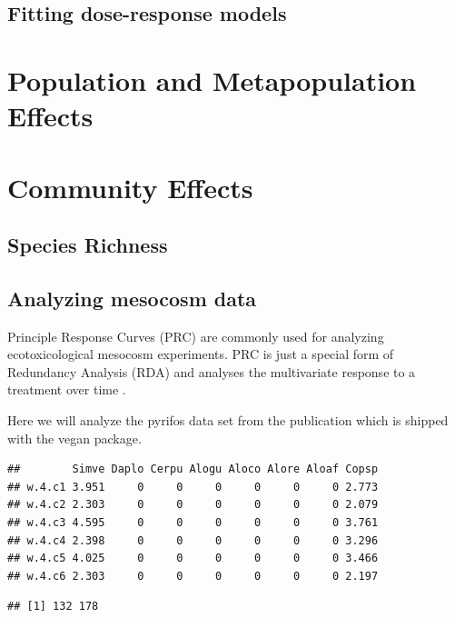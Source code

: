 \documentclass{tufte-book}\usepackage{knitr}
\begin{document}
\section{Fitting dose-response models}



\chapter{Population and Metapopulation Effects}



\chapter{Community Effects}

\section{Species Richness}

\section{Analyzing mesocosm data}
Principle Response Curves (PRC)\cite{van_den_brink_principal_1999} are commonly
used for analyzing ecotoxicological mesocosm experiments. PRC is just a 
special form of Redundancy Analysis (RDA) and analyses the multivariate response
to a treatment over time \cite{legendre_numerical_2013}.

Here we will analyze the pyrifos data set from the publication\cite{van_den_brink_principal_1999} which is shipped with the vegan package.

\begin{knitrout}
\color{fgcolor}\begin{kframe}
\begin{alltt}
\hlstd{(pyrifos[,} \hlstd{(}\hlopt{:}\hlstd{)])}
\end{alltt}
\begin{verbatim}
##        Simve Daplo Cerpu Alogu Aloco Alore Aloaf Copsp
## w.4.c1 3.951     0     0     0     0     0     0 2.773
## w.4.c2 2.303     0     0     0     0     0     0 2.079
## w.4.c3 4.595     0     0     0     0     0     0 3.761
## w.4.c4 2.398     0     0     0     0     0     0 3.296
## w.4.c5 4.025     0     0     0     0     0     0 3.466
## w.4.c6 2.303     0     0     0     0     0     0 2.197
\end{verbatim}
\begin{alltt}
\end{alltt}
\begin{verbatim}
## [1] 132 178
\end{verbatim}
\end{kframe}
\end{knitrout}
\end{document}
